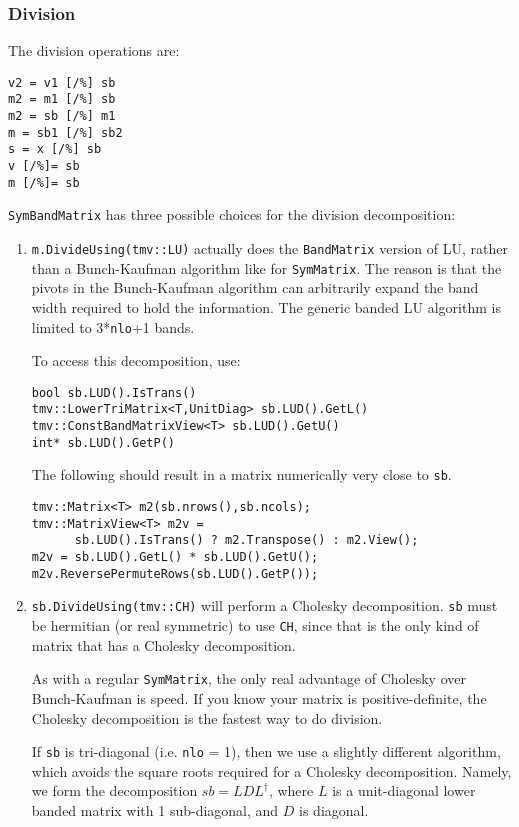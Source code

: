 \documentclass[twoside,letterpaper,11pt]{article}
\renewcommand{\tt}[1]{{\texttt {#1}}}
\begin{document}
\subsubsection{Division}

The division operations are:
\begin{verbatim}
v2 = v1 [/%] sb
m2 = m1 [/%] sb
m2 = sb [/%] m1
m = sb1 [/%] sb2
s = x [/%] sb
v [/%]= sb
m [/%]= sb
\end{verbatim}
\tt{SymBandMatrix} has three possible choices for the division decomposition:
\begin{enumerate}
\item
\tt{m.DivideUsing(tmv::LU)} actually does the \tt{BandMatrix} version of 
LU, rather than a Bunch-Kaufman algorithm like for \tt{SymMatrix}.  The
reason is that the pivots in the Bunch-Kaufman algorithm can arbitrarily
expand the band width required to hold the information.  The generic
banded LU algorithm is limited to 3*\tt{nlo}+1 bands.

To access this decomposition, use:
\begin{verbatim}
bool sb.LUD().IsTrans()
tmv::LowerTriMatrix<T,UnitDiag> sb.LUD().GetL()
tmv::ConstBandMatrixView<T> sb.LUD().GetU()
int* sb.LUD().GetP()
\end{verbatim}
The following should result in a matrix numerically very close to \tt{sb}.
\begin{verbatim}
tmv::Matrix<T> m2(sb.nrows(),sb.ncols);
tmv::MatrixView<T> m2v = 
      sb.LUD().IsTrans() ? m2.Transpose() : m2.View();
m2v = sb.LUD().GetL() * sb.LUD().GetU();
m2v.ReversePermuteRows(sb.LUD().GetP());
\end{verbatim}

\item
\tt{sb.DivideUsing(tmv::CH)} will perform a Cholesky decomposition.  
\tt{sb} must be hermitian (or real symmetric) to use \tt{CH}, since that is the
only kind of matrix that has a Cholesky decomposition.  

As with a regular \tt{SymMatrix},
the only real advantage of Cholesky over Bunch-Kaufman is speed.  If you know your 
matrix is positive-definite, the Cholesky decomposition is the fastest way to 
do division.

If \tt{sb} is tri-diagonal (i.e. \tt{nlo} = 1), then we use a slightly 
different algorithm, which avoids the square roots required for a
Cholesky decomposition.  
Namely, we form the decomposition $sb = LDL^\dagger$, where $L$ is a
unit-diagonal lower banded matrix with 1 sub-diagonal, and $D$ is diagonal.


\end{enumerate}
\end{document}
